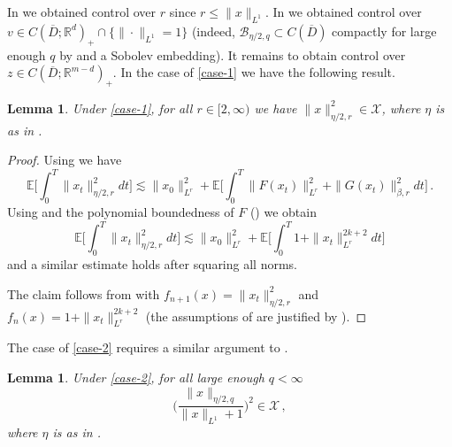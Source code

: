 \documentclass[final]{amsart}
\newtheorem{lem}[thm]{Lemma}
\numberwithin{thm}{section}
\numberwithin{equation}{section}
\newcommand{\E}{\mathbb{E}}
\newcommand{\R}{\mathbb{R}}
\newcommand{\B}{\mathcal{B}}
\newcommand{\X}{\mathcal{X}}
\begin{document}
In  we obtained control over $r$ since  $r \leq \|x\|_{L^1}$.
In  we obtained control over $v \in C(\overline D;\R^d)_+ \cap \{\|\cdot\|_{L^1} = 1\}$ (indeed, $\B_{\eta/2,q} \subset C(\overline D)$ compactly for large enough $q$ by  and a Sobolev embedding). It remains to obtain control over $z \in C(\overline D;\R^{m-d})_+$. In the case of \ref{case-1} we have the following result.

\begin{lem}\label{lem:z-compactness-case-1}
    Under \ref{case-1}, for all $r \in [2,\infty)$ we have $\|x\|_{\eta/2,r}^2 \in \X$, where $\eta$ is as in .
\end{lem}

\begin{proof}
    Using  we have
    $$\E\Big[\int_0^T \|x_t\|_{\eta/2,r}^2dt\Big] \lesssim \|x_0\|_{L^r}^2 + \E\Big[\int_0^T \|F(x_t)\|_{L^r}^2 + \|G(x_t)\|_{\beta,r}^2dt\Big] \,.$$
    Using  and the polynomial boundedness of $F$ () we obtain
    $$\E\Big[\int_0^T \|x_t\|_{\eta/2,r}^2dt\Big] \lesssim \|x_0\|_{L^r}^2 + \E\Big[\int_0^T 1 + \|x_t\|_{L^r}^{2k+2}dt\Big] $$
    and a similar estimate holds after squaring all norms. 

    
    The claim follows from  with $f_{n+1}(x) = \|x_t\|_{\eta/2,r}^2$ and $f_n(x) = 1 + \|x_t\|_{L^r}^{2k+2}$
    (the assumptions of  are justified by
    ).
\end{proof}

The case of \ref{case-2} requires a similar argument to .

\begin{lem}\label{lem:z-compactness-case-2}
    Under \ref{case-2}, for all large enough $q < \infty$
    $$\Big(\frac{\|x\|_{\eta/2,q}}{\|x\|_{L^1}+1}\Big)^2 \in \X \,,$$
    where $\eta$ is as in . 
\end{lem}
\end{document}
